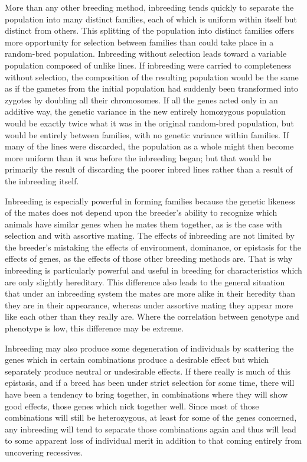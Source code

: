 More than any other breeding method, inbreeding tends quickly to
separate the population into many distinct families, each of which is
uniform within itself but distinct from others. This splitting of the
population into distinct families offers more opportunity for selection
between families than could take place in a random-bred population.
Inbreeding without selection leads toward a variable population composed
of unlike lines. If inbreeding were carried to completeness without
selection, the composition of the resulting population would be the
same as if the gametes from the initial population had suddenly been
transformed into zygotes by doubling all their chromosomes. If all the
genes acted only in an additive way, the genetic variance in the new
entirely homozygous population would be exactly twice what it was in
the original random-bred population, but would be entirely between
families, with no genetic variance within families. If many of the lines
were discarded, the population as a whole might then become more
uniform than it was before the inbreeding began; but that would be
primarily the result of discarding the poorer inbred lines rather than
a result of the inbreeding itself.

Inbreeding is especially powerful in forming families because the
genetic likeness of the mates does not depend upon the breeder's ability
to recognize which animals have similar genes when he mates them
together, as is the case with selection and with assortive mating. The
effects of inbreeding are not limited by the breeder's mistaking the
effects of environment, dominance, or epistasis
for the effects of genes,
as the effects of those other breeding methods are. That is why inbreeding
is particularly powerful and useful in breeding for characteristics
which are only slightly hereditary. This difference also leads to the general
situation that under an inbreeding system the mates are more alike
in their heredity than they are in their appearance, whereas under
assortive mating they appear more like each other than they really are.
Where the correlation between genotype and phenotype is low, this
difference may be extreme.

Inbreeding may also produce some degeneration of individuals by
scattering the genes which in certain combinations produce a desirable
effect but which separately produce neutral or undesirable effects. If
there really is much of this epistasis, and if a breed has been under strict
selection for some time, there will have been a tendency to bring together,
in combinations where they will show good effects, those genes which
nick together well. Since most of those combinations will still be heterozygous,
at least for some of the genes concerned, any inbreeding will
tend to separate those combinations again and thus will lead to some
apparent loss of individual merit in addition to that coming entirely
from uncovering recessives.

